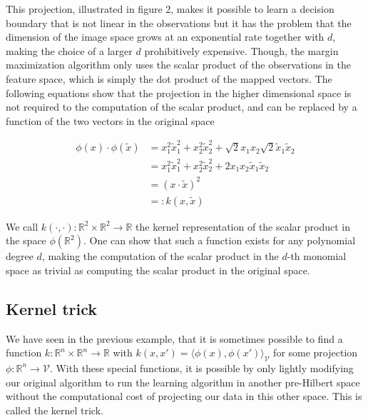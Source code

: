 This projection, illustrated in figure 2, makes it possible to learn a decision boundary that is not linear in the observations but it has the problem that the dimension of the image space grows at an exponential rate together with $d$, making the choice of a larger $d$ prohibitively expensive. Though, the margin maximization algorithm only uses the scalar product of the observations in the feature space, which is simply the dot product of the mapped vectors. The following equations show that the projection in the higher dimensional space is not required to the computation of the scalar product, and can be replaced by a function of the two vectors in the original space

\begin{equation*}
  \begin{aligned}
    \phi(x) \cdot \phi(\tilde{x})
    &= x_1^2\tilde{x}_1^2 + x_2^2\tilde{x}_2^2 + \sqrt{2}x_1x_2\sqrt{2}\tilde{x}_1\tilde{x}_2\\
    &= x_1^2\tilde{x}_1^2 + x_2^2\tilde{x}_2^2 + 2x_1x_2\tilde{x}_1\tilde{x}_2\\
    &= \left(x \cdot \tilde{x}\right)^2 \\
    &=: k(x, \tilde{x})
  \end{aligned}
\end{equation*}

We call $k(\cdot, \cdot) : \mathbb{R}^2 \times \mathbb{R}^2 \rightarrow \mathbb{R}$ the kernel representation of the scalar product in the space $\phi(\mathbb{R}^2)$. One can show that such a function exists for any polynomial degree $d$, making the computation of the scalar product in the $d$-th monomial space as trivial as computing the scalar product in the original space.

\subsection{Kernel trick}

We have seen in the previous example, that it is sometimes possible to find a function $k :\mathbb{R}^n \times \mathbb{R}^n \rightarrow \mathbb{R}$ with $k(x, x') = \langle \phi(x), \phi(x')\rangle _{\mathcal{V}}$ for some projection $\phi : \mathbb{R}^n \rightarrow \mathcal{V}$. With these special functions, it is possible by only lightly modifying our original algorithm to run the learning algorithm in another pre-Hilbert space without the computational cost of projecting our data in this other space. This is called the kernel trick.


